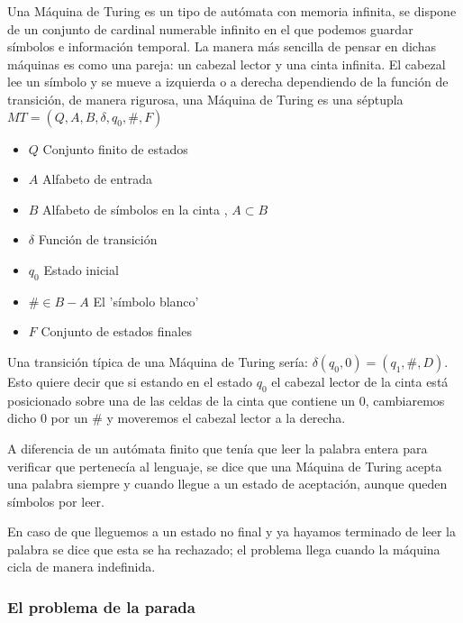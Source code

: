  Una Máquina de Turing es un tipo de autómata con memoria infinita, se dispone de un conjunto de cardinal numerable infinito en el que podemos guardar símbolos e información temporal. La manera más sencilla de pensar en dichas máquinas es como una pareja: un cabezal lector y una cinta infinita. El cabezal lee un símbolo y se mueve a izquierda o a derecha dependiendo de la función de transición, de manera rigurosa, una Máquina de Turing es una séptupla $MT=(Q,A,B,\delta,q_0,\#,F)$


\begin{multicols}{2}
	\begin{itemize}
		\item $Q$  Conjunto finito de estados
		\item $A$  Alfabeto de entrada
		\item $B$  Alfabeto de símbolos en la cinta , $A\subset B$
		\item $\delta$ Función de transición
		\item $q_0$ Estado inicial
		\item $\# \in B-A$ El 'símbolo blanco'	
		\item $F$ Conjunto de estados finales 
	\end{itemize}
\end{multicols} 
 
 
 Una transición típica de una Máquina de Turing sería: $\delta(q_0,0)=(q_1,\#,D)$. Esto quiere decir que si estando en el estado $q_0$ el cabezal lector de la cinta está posicionado sobre una de las celdas de la cinta que contiene un 0, cambiaremos dicho 0 por un $\#$ y moveremos el cabezal lector a la derecha.
 
 \vspace{10px}
 
 A diferencia de un autómata finito que tenía que leer la palabra entera para verificar que pertenecía al lenguaje, se dice que una Máquina de Turing acepta una palabra siempre y cuando llegue a un estado de aceptación, aunque queden símbolos por leer.
 
 \vspace{10px}
 
 En caso de que lleguemos a un estado no final y ya hayamos terminado de leer la palabra se dice que esta se ha rechazado; el problema llega cuando la máquina cicla de manera indefinida.


\subsubsection{El problema de la parada}


